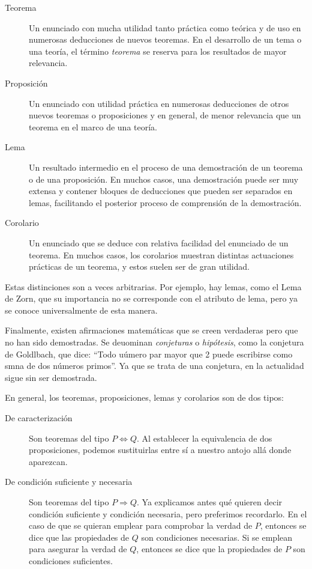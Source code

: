 \begin{description}
  \item[Teorema] Un enunciado con mucha utilidad tanto práctica como teórica
    y de uso en numerosas deducciones de nuevos teoremas. En el desarrollo
    de un tema o una teoría, el término \emph{teorema} se reserva para los
    resultados de mayor relevancia.

  \item[Proposición] Un enunciado con utilidad práctica en numerosas
    deducciones de otros nuevos teoremas o proposiciones y en general, de
    menor relevancia que un teorema en el marco de una teoría.

  \item[Lema] Un resultado intermedio en el proceso de una demostración de
    un teorema o de una proposición. En muchos casos, una demostración puede
    ser muy extensa y contener bloques de deducciones que pueden ser
    separados en lemas, facilitando el posterior proceso de comprensión de
    la demostración.

\item[Corolario] Un enunciado que se deduce con relativa facilidad del
    enunciado de un teorema. En muchos casos, los corolarios muestran
    distintas actuaciones prácticas de un teorema, y estos suelen ser de
    gran utilidad.
\end{description}

Estas distinciones son a veces arbitrarias. Por ejemplo, hay lemas, como el
Lema de Zorn, que su importancia no se corresponde con el atributo de lema,
pero ya se conoce universalmente de esta manera.

Finalmente, existen afirmaciones matemáticas que se creen verdaderas pero
que no han sido demostradas. Se deuominan \emph{conjeturas} o
\emph{hipótesis}, como la conjetura de Goldlbach, que dice: ``Todo uúmero
par mayor que 2 puede escribirse como smna de dos números primos''. Ya que
se trata de una conjetura, en la actualidad sigue sin ser demostrada.

En general, los teoremas, proposiciones, lemas y corolarios son de dos
tipos:

\begin{description}
  \item[De caracterización] Son teoremas del tipo $P \iff Q$. Al establecer
    la equivalencia de dos proposiciones, podemos sustituirlas entre sí a
    nuestro antojo allá donde aparezcan.

  \item[De condición suficiente y necesaria] Son teoremas del tipo $P
    \Longrightarrow Q$. Ya explicamos antes qué quieren decir condición
    suficiente y condición necesaria, pero preferimos recordarlo. En el caso
    de que se quieran emplear para comprobar la verdad de $P$, entonces se
    dice que las propiedades de $Q$ son condiciones necesarias. Si se
    emplean para asegurar la verdad de $Q$, entonces se dice que la
    propiedades de $P$ son condiciones suficientes.
\end{description}






